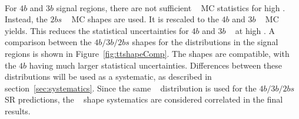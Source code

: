 \paragraph{}
For $4b$ and $3b$ signal regions, there are not sufficient \ttbar~ MC statistics for high \mtwoJ.
Instead, the $2bs$ \ttbar~ MC shapes are used.
It is rescaled to the $4b$ and $3b$ \ttbar~ MC yields.
This reduces the statistical uncertainties for $4b$ and $3b$ \ttbar~ at high \mtwoJ.
A comparison between the $4b/3b/2bs$ shapes for the \mtwoJ distributions in the signal regions is shown in Figure~\ref{fig:ttshapeComp}.
The shapes are compatible, with the $4b$ having much larger statistical uncertainties.  
Differences between these distributions will be used as a systematic, as described in section~\ref{sec:systematics}.
Since the same \ttbar~ distribution is used for the $4b/3b/2bs$ SR predictions, the \ttbar~ shape systematics are considered correlated in the final results. 



